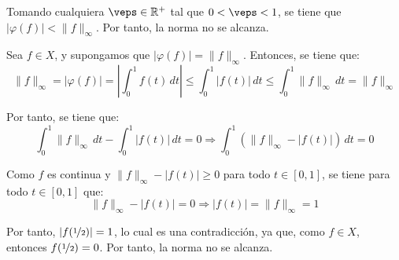 \begin{ejercicio}
\begin{description}
    Tomando cualquiera $\veps \in \bb{R}^+$ tal que $0 < \veps < 1$, se tiene que $|\varphi(f)| < \|f\|_\infty$. Por tanto, la norma no se alcanza.
    
    \item[Opción 2] Sea $f \in X$, y supongamos que $|\varphi(f)| = \|f\|_\infty$. Entonces, se tiene que:
    \begin{equation*}
        \|f\|_\infty = |\varphi(f)| = \left|\int_{0}^1 f(t)\,dt\right| \leq \int_{0}^1 |f(t)|\,dt \leq \int_{0}^1 \|f\|_\infty\,dt = \|f\|_\infty
    \end{equation*}

    Por tanto, se tiene que:
    \begin{equation*}
        \int_{0}^1 \|f\|_\infty\, dt - \int_{0}^1 |f(t)|\,dt = 0 \Longrightarrow \int_{0}^1 \left(\|f\|_\infty - |f(t)|\right)\,dt = 0
    \end{equation*}

    Como $f$ es continua y $\|f\|_\infty - |f(t)| \geq 0$ para todo $t \in [0, 1]$, se tiene para todo $t \in [0, 1]$ que:
    \begin{equation*}
        \|f\|_\infty - |f(t)| = 0 \Longrightarrow |f(t)| = \|f\|_\infty = 1
    \end{equation*}

    Por tanto, $|f(\nicefrac{1}{2})| = 1$, lo cual es una contradicción, ya que, como $f\in X$, entonces $f(\nicefrac{1}{2}) = 0$. Por tanto, la norma no se alcanza.
\end{description}
\end{ejercicio}

